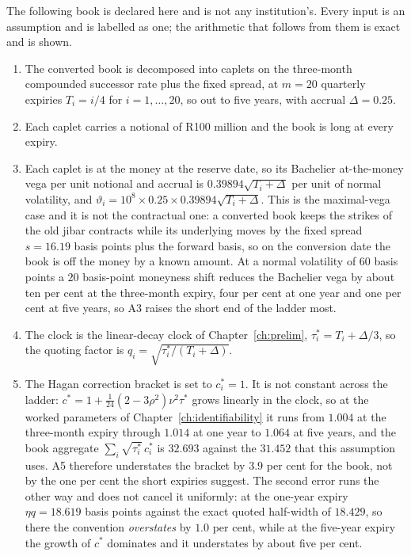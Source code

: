 \documentclass[../../../main.tex]{subfiles}
\begin{document}
The following book is declared here and is not any institution's. Every input is an assumption and is labelled as one; the arithmetic that follows from them is exact and is shown.

\begin{enumerate}[nosep,label=\textbf{A\arabic*.},leftmargin=2.2\parindent]
\item The converted book is decomposed into caplets on the three-month compounded successor rate plus the fixed spread, at $m=20$ quarterly expiries $T_i=i/4$ for $i=1,\dots,20$, so out to five years, with accrual $\Delta=0.25$.
\item Each caplet carries a notional of R100 million and the book is long at every expiry.
\item Each caplet is at the money at the reserve date, so its Bachelier at-the-money vega per unit notional and accrual is $0.39894\sqrt{T_i+\Delta}$ per unit of normal volatility, and $\vartheta_i=10^8\times0.25\times0.39894\sqrt{T_i+\Delta}$. This is the maximal-vega case and it is not the contractual one: a converted book keeps the strikes of the old \gls{jibar} contracts while its underlying moves by the fixed spread $s=16.19$ basis points plus the forward basis, so on the conversion date the book is off the money by a known amount. At a normal volatility of $60$ basis points a $20$ basis-point moneyness shift reduces the Bachelier vega by about ten per cent at the three-month expiry, four per cent at one year and one per cent at five years, so A3 raises the short end of the ladder most.
\item The clock is the linear-decay clock of Chapter~\ref{ch:prelim}, $\tau^*_i=T_i+\Delta/3$, so the quoting factor is $q_i=\sqrt{\tau^*_i/(T_i+\Delta)}$.
\item The Hagan correction bracket is set to $c^*_i=1$. It is not constant across the ladder: $c^*=1+\tfrac1{24}(2-3\rho^2)\nu^2\tau^*$ grows linearly in the clock, so at the worked parameters of Chapter~\ref{ch:identifiability} it runs from $1.004$ at the three-month expiry through $1.014$ at one year to $1.064$ at five years, and the book aggregate $\sum_i\sqrt{\tau^*_i}\,c^*_i$ is $32.693$ against the $31.452$ that this assumption uses. A5 therefore understates the bracket by $3.9$ per cent for the book, not by the one per cent the short expiries suggest. The second error runs the other way and does not cancel it uniformly: at the one-year expiry $\eta q=18.619$ basis points against the exact quoted half-width of $18.429$, so there the convention \emph{overstates} by $1.0$ per cent, while at the five-year expiry the growth of $c^*$ dominates and it understates by about five per cent.

\end{enumerate}
\end{document}
